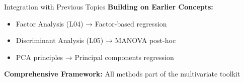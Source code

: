 \documentclass[aspectratio=169,ignorenonframetext]{beamer}
\begin{document}
\begin{frame}{Integration with Previous Topics}
\textbf{Building on Earlier Concepts:}

\begin{itemize}
\item
  Factor Analysis (L04) → Factor-based regression
\item
  Discriminant Analysis (L05) → MANOVA post-hoc
\item
  PCA principles → Principal components regression
\end{itemize}

\textbf{Comprehensive Framework:} All methods part of the multivariate
toolkit
\end{frame}
\end{document}
